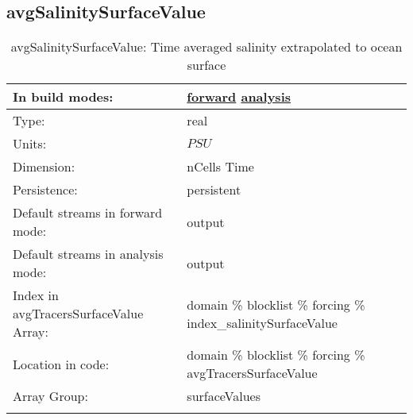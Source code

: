 \subsection[avgSalinitySurfaceValue]{avgSalinitySurfaceValue}
\label{subsec:var_sec_forcing_avgSalinitySurfaceValue}
\begin{center}
\begin{longtable}{| p{2.0in} | p{4.0in} |}
        \hline 
        In build modes: & \hyperref[subsec:forward_var_tab_forcing]{forward} \hyperref[subsec:analysis_var_tab_forcing]{analysis} \\
        \hline 
        Type: & real \\
        \hline 
        Units: & $PSU$ \\
        \hline 
        Dimension: & nCells Time \\
        \hline 
        Persistence: & persistent \\
        \hline 
		 Default streams in forward mode: &  output \\
        \hline 
		 Default streams in analysis mode: &  output \\
        \hline 
		 Index in avgTracersSurfaceValue Array: & domain \% blocklist \% forcing \% index\_salinitySurfaceValue \\
		 \hline 
		 Location in code: & domain \% blocklist \% forcing \% avgTracersSurfaceValue \\
		 \hline 
		 Array Group: & surfaceValues \\
		 \hline 
    \caption{avgSalinitySurfaceValue: Time averaged salinity extrapolated to ocean surface}
\end{longtable}
\end{center}
